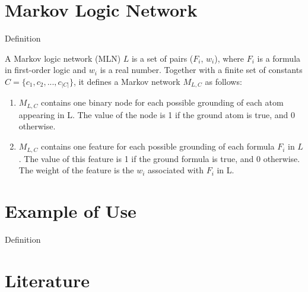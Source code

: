 \documentclass{beamer}
\begin{document}
\section{Markov Logic Network}
\begin{frame}[fragile]{Definition}
  \begin{definition}
    A Markov logic network (MLN) $L$ is a set of pairs ($F_i$, $w_i$),
    where $F_i$ is a formula in first-order logic and $w_i$ is a real
    number.  Together with a finite set of constants $C = \{c_1, c_2,
    ..., c_{|C|}\}$, it defines a Markov network $M_{L,C}$ as follows:
      \begin{enumerate}
      \item $M_{L,C}$ contains one binary node for each possible
        grounding of each atom appearing in L.  The value of the node
        is 1 if the ground atom is true, and 0 otherwise.

      \item $M_{L,C}$ contains one feature for each possible grounding
        of each formula $F_i$ in $L$.  The value of this feature is 1
        if the ground formula is true, and 0 otherwise.  The weight of
        the feature is the $w_i$ associated with $F_i$ in
        L.\cite{Domingos-06}
      \end{enumerate}
  \end{definition}
\end{frame}

\section{Example of Use}
\begin{frame}{Definition}
\end{frame}

\section{Literature}
\begin{frame}{\insertsection}
  
  
\end{frame}
\end{document}

